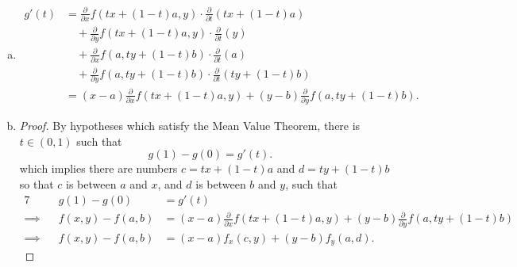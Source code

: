 \begin{Exercise}
\begin{enumerate}[a)]
\item
\begin{solution}
\begin{align*}
g'(t)
&= \frac{\partial}{\partial x}f(t x+(1-t)a, y)\cdot\frac{\partial}{\partial t}(t x+(1-t)a) \\
&\quad +\frac{\partial}{\partial y}f(t x+(1-t)a,y)\cdot\frac{\partial}{\partial t}(y) \\
&\quad +\frac{\partial}{\partial x}f(a, t y+(1-t)b)\cdot\frac{\partial}{\partial t}(a) \\
&\quad +\frac{\partial}{\partial y}f(a, t y+(1-t)b)\cdot\frac{\partial}{\partial t}(t y+(1-t)b) \\
&= (x-a)\frac{\partial}{\partial x}f(t x+(1-t)a,y) + (y-b)\frac{\partial}{\partial y}f(a,t y+(1-t)b).
\end{align*}
\end{solution}

\item
\begin{proof}
By hypotheses which satisfy the Mean Value Theorem, there is $t\in(0,1)$ such that
$$
g(1)-g(0) = g'(t).
$$
which implies there are numbers $c=t x+(1-t)a$ and $d=t y+(1-t)b$ so that $c$ is between $a$ and $x$, and $d$ is between $b$ and $y$, such that
\begin{alignat*}{7}
\quad&& g(1)-g(0) &= g'(t) \\
\implies&& f(x,y)-f(a,b) &= (x-a)\frac{\partial}{\partial x}f(t x+(1-t)a,y) + (y-b)\frac{\partial}{\partial y}f(a,t y+(1-t)b) \\
\implies&& f(x,y)-f(a,b) &= (x-a)f_x(c,y)+(y-b)f_y(a,d).
\end{alignat*}
\end{proof}
\end{enumerate}
\end{Exercise}